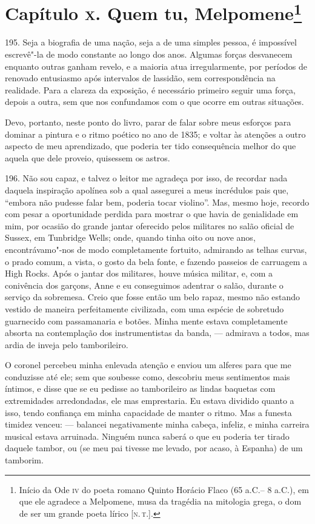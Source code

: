 \chapter{Capítulo \textsc{x}. Quem tu, Melpomene\footnote[*]{Início da Ode \textsc{iv} do poeta romano Quinto   Horácio Flaco (65 a.C.-- 8 a.C.), em que ele agradece a Melpomene,
  musa da tragédia na mitologia grega, o dom de ser um grande poeta
  lírico {[}\textsc{n.\,t.}{]}.}}

195. Seja a biografia de uma nação, seja a de uma simples pessoa, é
impossível escrevê"-la de modo constante ao longo dos anos. Algumas
forças desvanecem enquanto outras ganham revelo, e a maioria atua
irregularmente, por períodos de renovado entusiasmo após intervalos de
lassidão, sem correspondência na realidade. Para a clareza da exposição,
é necessário primeiro seguir uma força, depois a outra, sem que nos
confundamos com o que ocorre em outras situações.

Devo, portanto, neste ponto do livro, parar de falar sobre meus esforços
para dominar a pintura e o ritmo poético no ano de 1835; e voltar às
atenções a outro aspecto de meu aprendizado, que poderia ter tido
consequência melhor do que aquela que dele proveio, quisessem os astros.

196. Não sou capaz, e talvez o leitor me agradeça por isso, de recordar
nada daquela inspiração apolínea sob a qual assegurei a meus incrédulos
pais que, ``embora não pudesse falar bem, poderia tocar violino''. Mas,
mesmo hoje, recordo com pesar a oportunidade perdida para mostrar o que
havia de genialidade em mim, por ocasião do grande jantar oferecido
pelos militares no salão oficial de Sussex, em Tunbridge Wells; onde,
quando tinha oito ou nove anos, encontrávamo"-nos de modo completamente
fortuito, admirando as telhas curvas, o prado comum, a vista, o gosto da
bela fonte, e fazendo passeios de carruagem a High Rocks. Após o jantar
dos militares, houve música militar, e, com a conivência dos garçons,
Anne e eu conseguimos adentrar o salão, durante o serviço da sobremesa.
Creio que fosse então um belo rapaz, mesmo não estando vestido de
maneira perfeitamente civilizada, com uma espécie de sobretudo
guarnecido com passamanaria e botões. Minha mente estava completamente
absorta na contemplação dos instrumentistas da banda, --- admirava a
todos, mas ardia de inveja pelo tamborileiro.

O coronel percebeu minha enlevada atenção e enviou um alferes para que
me conduzisse até ele; sem que soubesse como, descobriu meus sentimentos
mais íntimos, e disse que se eu pedisse ao tamborileiro as lindas
baquetas com extremidades arredondadas, ele mas emprestaria. Eu estava
dividido quanto a isso, tendo confiança em minha capacidade de manter o
ritmo. Mas a funesta timidez venceu: --- balancei negativamente minha
cabeça, infeliz, e minha carreira musical estava arruinada. Ninguém
nunca saberá o que eu poderia ter tirado daquele tambor, ou (se meu pai
tivesse me levado, por acaso, à Espanha) de um tamborim.

